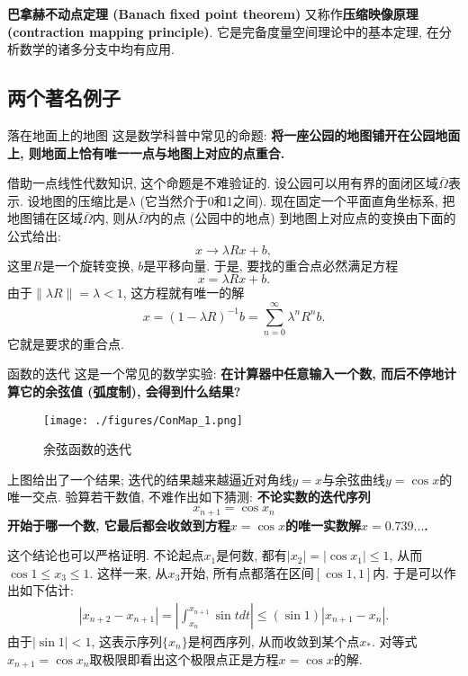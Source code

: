 

\textbf{巴拿赫不动点定理 (Banach fixed point theorem)} 又称作\textbf{压缩映像原理 (contraction mapping principle)}. 它是完备度量空间理论中的基本定理, 在分析数学的诸多分支中均有应用.

\subsection{两个著名例子}
\begin{example}{落在地面上的地图}
这是数学科普中常见的命题: \textbf{将一座公园的地图铺开在公园地面上, 则地面上恰有唯一一点与地图上对应的点重合.} 

借助一点线性代数知识, 这个命题是不难验证的. 设公园可以用有界的面闭区域$\bar\Omega$表示. 设地图的压缩比是$\lambda$ (它当然介于0和1之间). 现在固定一个平面直角坐标系, 把地图铺在区域$\bar\Omega$内, 则从$\bar\Omega$内的点 (公园中的地点) 到地图上对应点的变换由下面的公式给出:
$$
x\to \lambda Rx+b,
$$
这里$R$是一个旋转变换, $b$是平移向量. 于是, 要找的重合点必然满足方程
$$
x=\lambda Rx+b.
$$
由于$\|\lambda R\|=\lambda<1$, 这方程就有唯一的解
$$
x=(1-\lambda R)^{-1}b=\sum_{n=0}^{\infty}\lambda^nR^nb.
$$
它就是要求的重合点.
\end{example}

\begin{example}{函数的迭代}
这是一个常见的数学实验: \textbf{在计算器中任意输入一个数, 而后不停地计算它的余弦值 (弧度制), 会得到什么结果? }

\begin{figure}[ht]
\centering
\texttt{[image: ./figures/ConMap\_1.png]}
\caption{余弦函数的迭代} \label{ConMap_fig1}
\end{figure}

上图给出了一个结果; 迭代的结果越来越逼近对角线$y=x$与余弦曲线$y=\cos x$的唯一交点. 验算若干数值, 不难作出如下猜测: \textbf{不论实数的迭代序列
$$
x_{n+1}=\cos x_n
$$
开始于哪一个数, 它最后都会收敛到方程$x=\cos x$的唯一实数解$x=0.739...$.}

这个结论也可以严格证明. 不论起点$x_1$是何数, 都有$|x_2|=|\cos x_1|\leq 1$, 从而$\cos 1\leq x_3\leq 1$. 这样一来, 从$x_3$开始, 所有点都落在区间$[\cos 1,1]$内. 于是可以作出如下估计:
$$
\begin{aligned}
|x_{n+2}-x_{n+1}|
=\left|\int_{x_{n}}^{x_{n+1}}\sin tdt\right|
\leq (\sin 1)|x_{n+1}-x_n|.
\end{aligned}
$$
由于$|\sin1|<1$, 这表示序列$\{x_n\}$是柯西序列, 从而收敛到某个点$x_*$. 对等式$x_{n+1}=\cos x_n$取极限即看出这个极限点正是方程$x=\cos x$的解.
\end{example}



